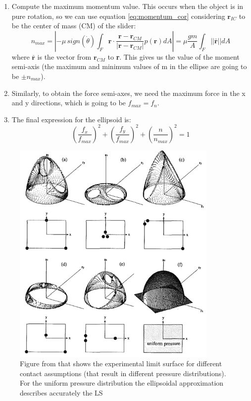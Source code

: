 \documentclass[12,twoside]{TFG-GM}
\theoremstyle{definition}
\theoremstyle{remark}
\newcommand*\diff[1]{\bar{#1}}
\begin{document}
\begin{enumerate}
\item Compute the maximum momentum value. This occurs when the object is in pure rotation, so we can use equation \ref{eq:momentum_cor} considering $\textbf{r}_{IC}$ to be the center of mass (CM) of the slider:
\begin{equation} \label{eq:max_momentum}
n_{max} =  \left| - \mu \, sign(\dot{\theta}) \int_F \textbf{r} \cdot \dfrac{\textbf{r} - \textbf{r}_{CM}}{|\textbf{r} - \textbf{r}_{CM}|} p(\textbf{r}) dA \right| = \mu \dfrac{g m}{A} \int_F ||\diff{\textbf{r}}|| dA
\end{equation}
where $\diff{\textbf{r}}$ is the vector from $\textbf{r}_{CM}$ to \textbf{r}. This gives us the value of the moment semi-axis (the maximum and minimum values of m in the ellipse are going to be $\pm n_{max}$).
\item Similarly, to obtain the force semi-axes, we need the maximum force in the x and y directions, which is going to be $f_{max} = f_n$.
\item The final expression for the ellipsoid is:
\begin{equation} \label{eq:max_momentum}
\left(\dfrac{f_x}{f_{max}}\right)^2 + \left(\dfrac{f_y}{f_{max}}\right)^2 + \left(\dfrac{n}{n_{max}}\right)^2 = 1
\end{equation}
\end{enumerate}


\begin{figure}[htb!]
\begin{center}
\includegraphics[width=10cm]{ell_limit_surfaces.png}
\end{center}
\caption[test caption]{\label{fig:ls_ellipsoid} \small{Figure from \protect\cite{ellipsoidal_ls} that shows the experimental limit surface for different contact assumptions (that result in different pressure distributions). For the uniform pressure distribution the ellipsoidal approximation describes accurately the LS}}
\end{figure}
\end{document}
